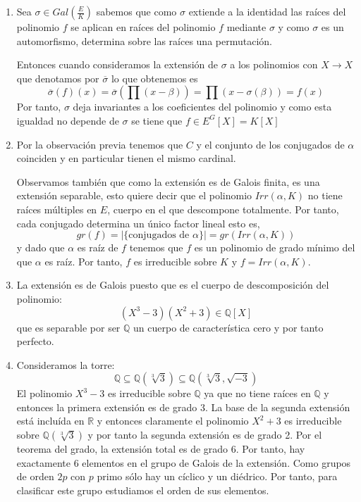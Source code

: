 \documentclass{article}
\theoremstyle{theorem-style}  %
\theoremstyle{definition-style}
\theoremstyle{example-style}
\begin{document}
\begin{enumerate}
\item Sea $\sigma \in Gal(\frac{E}{K})$ sabemos que como $\sigma$ extiende a la identidad las raíces del polinomio $f$ se aplican en raíces del polinomio $f$ mediante $\sigma$ y como $\sigma$ es un automorfismo, determina sobre las raíces una permutación. 

Entonces cuando consideramos la extensión de $\sigma$ a los polinomios con $X \to X$ que denotamos por $\overline{\sigma}$ lo que obtenemos es $$\overline{\sigma}(f)(x) = \overline{\sigma}(\prod (x - \beta)) = \prod (x - \sigma(\beta)) = f(x)$$ Por tanto, $\sigma$ deja invariantes a los coeficientes del polinomio y como esta igualdad no depende de $\sigma$ se tiene que $f \in E^G[X] = K[X]$
\item Por la observación previa tenemos que $C$ y el conjunto de los conjugados de $\alpha$ coinciden y en particular tienen el mismo cardinal. 

Observamos también que como la extensión es de Galois finita, es una extensión separable, esto quiere decir que el polinomio $Irr(\alpha,K)$ no tiene raíces múltiples en $E$, cuerpo en el que descompone totalmente. Por tanto, cada conjugado determina un único factor lineal esto es, $$gr(f) = |\{ \text{conjugados de  } \alpha \}|= gr(Irr(\alpha,K))$$ y dado que $\alpha$ es raíz de $f$ tenemos que $f$ es un polinomio de grado mínimo del que $\alpha$ es raíz. Por tanto, $f$ es irreducible sobre $K$ y $f = Irr(\alpha,K)$. 

\item La extensión es de Galois puesto que es el cuerpo de descomposición del polinomio: $$(X^3-3)(X^2+3) \in \mathbb{Q}[X]$$ que es separable por ser $\mathbb{Q}$ un cuerpo de característica cero y por tanto perfecto. 

\item Consideramos la torre: $$\mathbb{Q} \subseteq \mathbb{Q}(\sqrt[3]{3}) \subseteq \mathbb{Q}(\sqrt[3]{3},\sqrt{-3})$$ El polinomio $X^3-3$ es irreducible sobre $\mathbb{Q}$ ya que no tiene raíces en $\mathbb{Q}$ y entonces la primera extensión es de grado 3. La base de la segunda extensión está incluída en $\mathbb{R}$ y entonces claramente el polinomio $X^2 + 3$ es irreducible sobre $\mathbb{Q}(\sqrt[3]{3})$ y por tanto la segunda extensión es de grado 2. Por el teorema del grado, la extensión total es de grado 6. Por tanto, hay exactamente 6 elementos en el grupo de Galois de la extensión. Como grupos de orden $2p$ con $p$ primo sólo hay un cíclico y un diédrico. Por tanto, para clasificar este grupo estudiamos el orden de sus elementos. 


\end{enumerate}
\end{document}
